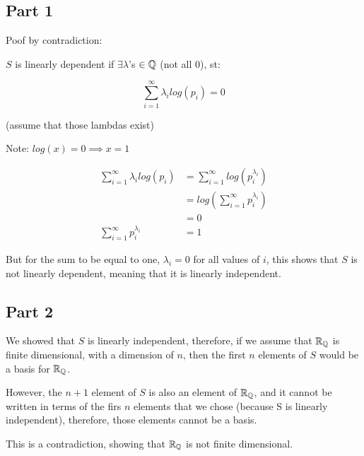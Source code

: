 \documentclass[12pt]{article} %
\begin{document}
\begin{homeworkProblem}

    \subsection*{Part 1}
    Poof by contradiction:

    $S$ is linearly dependent if $\exists \lambda$'s $\in \mathbb{Q}$ (not all 0), st:

    $$
        \sum_{i = 1}^{\infty} \lambda_i log(p_i) = 0
    $$

    (assume that those lambdas exist)

    Note: $log(x) = 0 \implies x = 1$

    \begin{align*}
        \sum_{i = 1}^{\infty} \lambda_i log(p_i)
         & =\sum_{i = 1}^{\infty} log(p_i^{\lambda_i})  \\
         & = log(\sum_{i = 1}^{\infty} p_i^{\lambda_i}) \\
         & = 0                                          \\
        \sum_{i = 1}^{\infty} p_i^{\lambda_i}
         & = 1
    \end{align*}

    But for the sum to be equal to one, $\lambda_i = 0$ for all values of $i$, this shows that $S$ is not linearly dependent, meaning that it is linearly independent.

    \subsection*{Part 2}

    We showed that $S$ is linearly independent, therefore, if we assume that $\mathbb{R}_{\mathbb{Q}}$ is finite dimensional, with a dimension of $n$, then
    the first $n$ elements of $S$ would be a basis for $\mathbb{R}_{\mathbb{Q}}$.

    However, the $n + 1$ element of $S$ is also an element of $\mathbb{R}_{\mathbb{Q}}$, and it cannot be written in terms of the firs $n$ elements that we chose (because S is linearly independent),
    therefore, those elements cannot be a basis.

    This is a contradiction, showing that $\mathbb{R}_{\mathbb{Q}}$ is not finite dimensional.

\end{homeworkProblem}
\pagebreak
\end{document}
